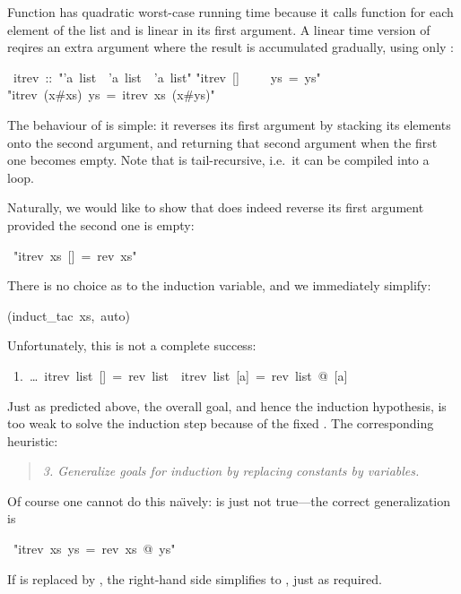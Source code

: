 \begin{isabelle}%
%
\begin{isamarkuptext}%
Function  has quadratic worst-case running time
because it calls function \isa{\at} for each element of the list and
\isa{\at} is linear in its first argument.  A linear time version of
 reqires an extra argument where the result is accumulated
gradually, using only \isa{\#}:%
\end{isamarkuptext}%
\ itrev\ ::\ {"}'a\ list\ {\isasymRightarrow}\ 'a\ list\ {\isasymRightarrow}\ 'a\ list{"}\isanewline
{}\isanewline
{"}itrev\ []\ \ \ \ \ ys\ =\ ys{"}\isanewline
{"}itrev\ (x\#xs)\ ys\ =\ itrev\ xs\ (x\#ys){"}%
\begin{isamarkuptext}%
\noindent The behaviour of  is simple: it reverses
its first argument by stacking its elements onto the second argument,
and returning that second argument when the first one becomes
empty. Note that  is tail-recursive, i.e.\ it can be
compiled into a loop.

Naturally, we would like to show that  does indeed reverse
its first argument provided the second one is empty:%
\end{isamarkuptext}%
\ {"}itrev\ xs\ []\ =\ rev\ xs{"}%
\begin{isamarkuptxt}%
\noindent
There is no choice as to the induction variable, and we immediately simplify:%
\end{isamarkuptxt}%
(induct\_tac\ xs,\ auto)%
\begin{isamarkuptxt}%
\noindent
Unfortunately, this is not a complete success:
\begin{isabellepar}%
~1.~\dots~itrev~list~[]~=~rev~list~{\isasymLongrightarrow}~itrev~list~[a]~=~rev~list~@~[a]%
\end{isabellepar}%
Just as predicted above, the overall goal, and hence the induction
hypothesis, is too weak to solve the induction step because of the fixed
\isa{[]}. The corresponding heuristic:
\begin{quote}
{\em 3. Generalize goals for induction by replacing constants by variables.}
\end{quote}

Of course one cannot do this na\"{\i}vely:  is
just not true---the correct generalization is%
\end{isamarkuptxt}%
\ {"}itrev\ xs\ ys\ =\ rev\ xs\ @\ ys{"}%
\begin{isamarkuptxt}%
\noindent
If  is replaced by \isa{[]}, the right-hand side simplifies to
, just as required.


\end{isamarkuptxt}
\end{isabelle}
